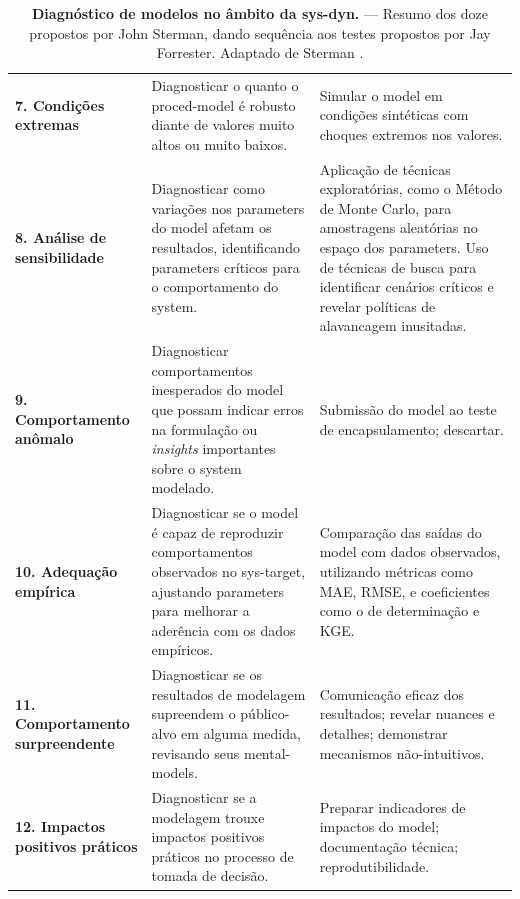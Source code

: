 \documentclass[./main.tex]{subfiles}
\begin{document}
{\begin{table}[t!]
\begin{tabular}{ 
 >{\raggedright\arraybackslash}m{2.75cm}  
 >{\raggedright\arraybackslash}m{5cm}  
 >{\raggedright\arraybackslash}m{5cm}}
        \textbf{7. Condições extremas} & Diagnosticar o quanto o \gls{proced-model} é robusto diante de valores muito altos ou muito baixos.& Simular o \gls{model} em condições sintéticas com choques extremos nos valores.\\

        \textbf{8. Análise de sensibilidade} & Diagnosticar como variações nos \gls{parameters} do \gls{model} afetam os resultados, identificando \gls{parameters} críticos para o comportamento do \gls{system}. & Aplicação de técnicas exploratórias, como o Método de Monte Carlo, para amostragens aleatórias no espaço dos \gls{parameters}. Uso de técnicas de busca para identificar cenários críticos e revelar políticas de alavancagem inusitadas.\\
        
        \textbf{9. Comportamento anômalo} & Diagnosticar comportamentos inesperados do \gls{model} que possam indicar erros na formulação ou \textit{insights} importantes sobre o \gls{system} modelado. & Submissão do \gls{model} ao teste de encapsulamento; descartar.\\
        
        \textbf{10. Adequação empírica} & Diagnosticar se o \gls{model} é capaz de reproduzir comportamentos observados no \gls{sys-target}, ajustando \gls{parameters} para melhorar a aderência com os dados empíricos. & Comparação das saídas do \gls{model} com dados observados, utilizando métricas como MAE, RMSE, e coeficientes como o de determinação e KGE.\\
        
        \textbf{11. Comportamento surpreendente} & Diagnosticar se os resultados de modelagem supreendem o público-alvo em alguma medida,  revisando seus \gls{mental-models}.& 
        Comunicação eficaz dos resultados; revelar nuances e detalhes; demonstrar mecanismos não-intuitivos.\\  
        
        \textbf{12. Impactos positivos práticos} & Diagnosticar se a modelagem trouxe impactos positivos práticos no processo de tomada de decisão.& Preparar indicadores de impactos do \gls{model}; documentação técnica; reprodutibilidade.\\  
        \bottomrule
    \end{tabular}
    \caption[Diagnóstico de modelos.]{
    \textbf{Diagnóstico de modelos no âmbito da \gls{sys-dyn}.}\; --- \;Resumo dos doze   propostos por John Sterman, dando sequência aos testes propostos por Jay Forrester. Adaptado de Sterman \cite{sterman2000}.
    }
    \label{tbl:tests}
\end{table}
}
\end{document}
